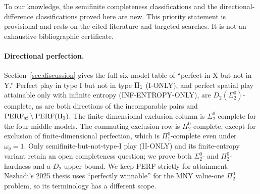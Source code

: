 To our knowledge, the semifinite completeness classifications and
the directional-difference classifications proved here are new.
This priority statement is provisional and rests on the cited
literature and targeted searches.
It is not an exhaustive bibliographic certificate.

\paragraph{Directional perfection.}
Section~\ref{sec:discussion} gives the full six-model table of
``perfect in X but not in Y.'' Perfect play in type I but not in
type $\mathrm{II}_1$ (I-ONLY), and perfect spatial play attainable only with
infinite entropy (INF-ENTROPY-ONLY), are
$D_2(\Sigma^0_2)$-complete, as are both directions of the incomparable
pairs and $\mathrm{PERF}_{\mathrm{sf}}\setminus\mathrm{PERF}(\mathrm{II}_1)$.
The finite-dimensional exclusion column is $\Sigma^0_2$-complete
for the four middle models. The commuting exclusion row is
$\Pi^0_2$-complete, except for exclusion of finite-dimensional
perfection, which is $\Pi^0_1$-complete even under $\omega_q=1$.
Only semifinite-but-not-type-I play (II-ONLY) and its
finite-entropy variant retain an open completeness question;
we prove both $\Sigma^0_2$- and $\Pi^0_2$-hardness and a $D_2$ upper
bound. We keep PERF strictly for attainment. Nezhadi's 2025 thesis
\cite{Nezhadi} uses ``perfectly winnable'' for the MNY value-one
$\Pi^0_2$ problem, so its terminology has a different scope.
